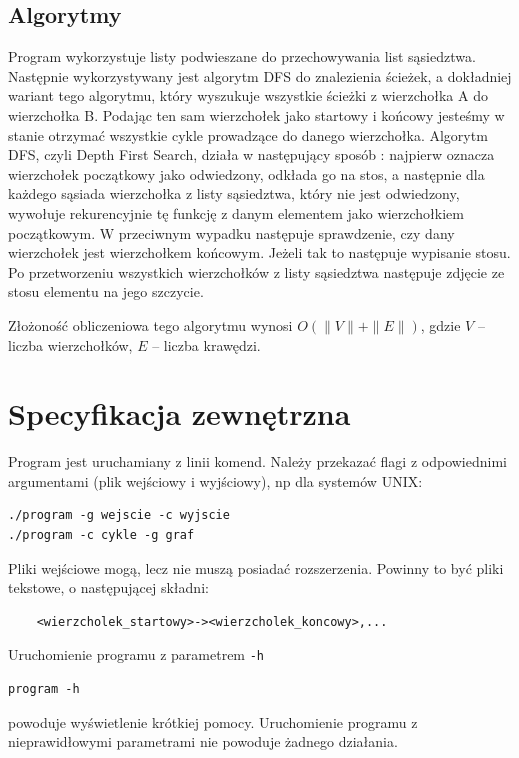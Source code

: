 \documentclass[12pt,a4paper]{article}
\begin{document}
\newpage
\subsection{Algorytmy}
Program wykorzystuje listy podwieszane do przechowywania list sąsiedztwa. Następnie wykorzystywany jest algorytm DFS do znalezienia ścieżek, a dokładniej wariant tego algorytmu, który wyszukuje
wszystkie ścieżki z wierzchołka A do wierzchołka B. Podając ten sam wierzchołek jako startowy i końcowy jesteśmy w stanie otrzymać wszystkie cykle prowadzące do danego wierzchołka. 
Algorytm DFS, czyli Depth First Search, działa w następujący sposób \cite{podstawoweAlgorytmy}: najpierw oznacza wierzchołek początkowy jako odwiedzony, odkłada go na stos,
a następnie dla każdego sąsiada wierzchołka z listy sąsiedztwa, który nie jest odwiedzony, wywołuje rekurencyjnie tę funkcję z danym elementem jako wierzchołkiem początkowym. W przeciwnym
wypadku następuje sprawdzenie, czy dany wierzchołek jest wierzchołkem końcowym. Jeżeli tak to następuje wypisanie stosu. Po przetworzeniu wszystkich wierzchołków z listy sąsiedztwa
następuje zdjęcie ze stosu elementu na jego szczycie.

Złożoność obliczeniowa \cite{podstawoweAlgorytmy} tego algorytmu wynosi $O(\|V\|+\|E\|)$, gdzie $V$ -- liczba wierzchołków, $E$ -- liczba krawędzi.

\section{Specyfikacja zewnętrzna}
\label{sec:sp:zewnetrzna}
Program jest uruchamiany z linii komend. Należy przekazać flagi z odpowiednimi argumentami (plik wejściowy i wyjściowy), np dla systemów UNIX:
\begin{verbatim}
./program -g wejscie -c wyjscie
./program -c cykle -g graf
\end{verbatim}
Pliki wejściowe mogą, lecz nie muszą posiadać rozszerzenia. Powinny to być pliki tekstowe, o następującej składni:
\begin{verbatim}
	<wierzcholek_startowy>-><wierzcholek_koncowy>,...
\end{verbatim} 
Uruchomienie programu z parametrem \texttt{-h}
\begin{verbatim}
program -h
\end{verbatim}
powoduje wyświetlenie krótkiej pomocy. Uruchomienie programu z nieprawidłowymi parametrami nie powoduje żadnego działania.
\end{document}
